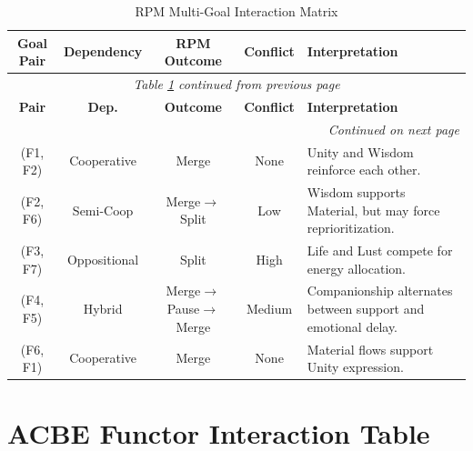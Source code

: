 \renewcommand{\arraystretch}{1.25}
\small
\begin{longtable}{c|c|c|c|p{5cm}}
\caption{RPM Multi-Goal Interaction Matrix}
\label{tab:rpm-multigoal} \\
\toprule
\textbf{Goal Pair}
& \textbf{Dependency}
& \textbf{RPM Outcome}
& \textbf{Conflict}
& \textbf{Interpretation}
\\
\midrule
\endfirsthead
\multicolumn{5}{c}{\textit{Table \ref{tab:rpm-multigoal} continued from previous page}} \\
\toprule
\textbf{Pair}
& \textbf{Dep.}
& \textbf{Outcome}
& \textbf{Conflict}
& \textbf{Interpretation}
\\
\midrule
\endhead
\midrule
\multicolumn{5}{r}{\textit{Continued on next page}} \\
\endfoot
\bottomrule
\endlastfoot

(F1, F2) & Cooperative & Merge & None &
Unity and Wisdom reinforce each other. \\

(F2, F6) & Semi-Coop & Merge$\to$Split & Low &
Wisdom supports Material, but may force reprioritization. \\

(F3, F7) & Oppositional & Split & High &
Life and Lust compete for energy allocation. \\

(F4, F5) & Hybrid & Merge$\to$Pause$\to$Merge & Medium &
Companionship alternates between support and emotional delay. \\

(F6, F1) & Cooperative & Merge & None &
Material flows support Unity expression. \\

\end{longtable}
\normalsize

\section{ACBE Functor Interaction Table}

